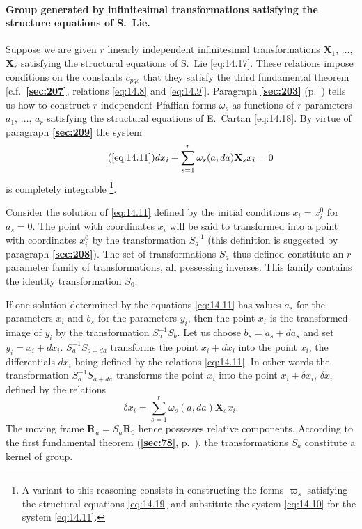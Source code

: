 \documentclass[leqno,11pt]{book}
\numberwithin{equation}{chapter}
\theoremstyle{shape1}
\theoremstyle{shapesmall}
\newcommand{\fsref}[1]{{\rm\textsection\textbf{\ref{sec:#1}}}}
\newcommand{\vp}{\varpi}
\begin{document}
\paragraph{Group generated by infinitesimal transformations satisfying the structure equations of S.~Lie.}
\label{sec:211}
Suppose we are given $r$ linearly independent infinitesimal transformations $\mathbf{X}_{1}$, $\dots$, $\mathbf{X}_{r}$ satisfying the structural equations of S.~Lie \eqref{eq:14.17}. These relations impose conditions on the constants $c_{pqs}$ that they satisfy the third fundamental theorem [c.f.~\fsref{207}, relations \eqref{eq:14.8} and \eqref{eq:14.9}]. Paragraph \fsref{203} (p.~\pageref{sec:203}) tells us how to construct $r$ independent Pfaffian forms $\omega_{s}$ as functions of $r$ parameters $a_{1}$, $\dots$, $a_{r}$ satisfying the structural equations of E.~Cartan \eqref{eq:14.18}. By virtue of paragraph \fsref{209} the system
\begin{equation}
  \tag{\ref{eq:14.11}}
  dx_{i}+\sum_{s=1}^{r}\omega_{s}(a,da)\mathbf{X}_{s}x_{i}=0
\end{equation}
is completely integrable \footnote{A variant to this reasoning consists in constructing the forms $\vp_{s}$ satisfying the structural equations \eqref{eq:14.19} and substitute the system \eqref{eq:14.10} for the system \eqref{eq:14.11}.}.

Consider the solution of \eqref{eq:14.11} defined by the initial conditions $x_{i}=x_{i}^{0}$ for $a_{s}=0$. The point with coordinates $x_{i}$ will be said to transformed into a point with coordinates $x_{i}^{0}$ by the transformation $S_{a}^{-1}$ (this definition is suggested by paragraph \fsref{208}). The set of transformations $S_{a}$ thus defined constitute an $r$ parameter family of transformations, all possessing inverses. This family contains the identity transformation $S_{0}$.

If one solution determined by the equations \eqref{eq:14.11} has values $a_{s}$ for the parameters $x_{i}$ and $b_{s}$ for the parameters $y_{i}$, then the point $x_{i}$ is the transformed image of $y_{i}$ by the transformation $S_{a}^{-1}S_{b}$. Let us choose $b_{s}=a_{s}+da_{s}$ and set $y_{i}=x_{i}+dx_{i}$. $S_{a}^{-1}S_{a+da}$ transforms the point $x_{i}+d x_{i}$ into the point $x_{i}$, the differentials $dx_{i}$ being defined by the relations \eqref{eq:14.11}. In other words the transformation $S_{a}^{-1}S_{a+da}$ transforms the point $x_{i}$ into the point $x_{i}+\delta x_{i}$, $\delta x_{i}$ defined by the relations
\[
\delta x_{i}=\sum_{s=1}^{r}\omega_{s}(a,da)\mathbf{X}_{s}x_{i}.
\]
The moving frame $\mathbf{R}_{a}=S_{a}\mathbf{R}_{0}$ hence possesses relative components. According to the first fundamental theorem (\fsref{78}, p.~\pageref{sec:78}), the transformations $S_{a}$ constitute a kernel of group.
\end{document}
